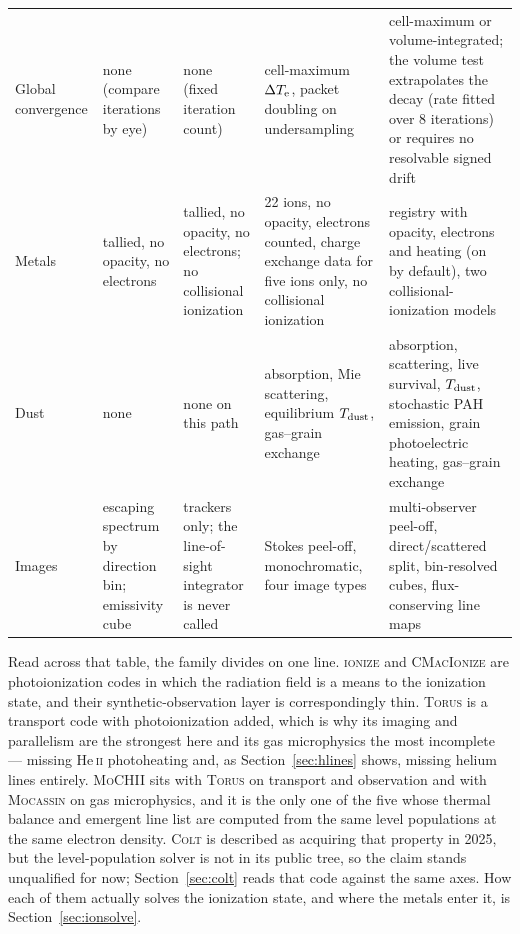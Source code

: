 \documentclass[english,a4paper]{my_memo}
\newcommand{\MoCHII}{\textsc{MoCHII}}
\newcommand{\Wood}{\textsc{ionize}}
\newcommand{\CMI}{\textsc{CMacIonize}}
\newcommand{\Torus}{\textsc{Torus}}
\newcommand{\Mocassin}{\textsc{Mocassin}}
\newcommand{\Colt}{\textsc{Colt}}
\newcommand{\HeII}{He\,\textsc{ii}}
\newcommand{\Te}{T_{\rm e}}
\begin{document}
\begin{longtable}{P{0.135\textwidth}P{0.185\textwidth}P{0.185\textwidth}P{0.185\textwidth}P{0.185\textwidth}}
Global convergence & none (compare iterations by eye) & none (fixed
iteration count) & cell-maximum $\Delta\Te$, packet doubling on undersampling
& cell-maximum or volume-integrated; the volume test extrapolates the decay
(rate fitted over 8 iterations) or requires no resolvable signed drift \\

Metals & tallied, no opacity, no electrons & tallied, no opacity, no
electrons; no collisional ionization & 22 ions, no opacity, electrons
counted, charge exchange data for five ions only, no collisional ionization &
registry with opacity, electrons and heating (on by default), two
collisional-ionization models \\

Dust & none & none on this path & absorption, Mie scattering, equilibrium
$T_{\rm dust}$, gas--grain exchange & absorption, scattering, live survival,
$T_{\rm dust}$, stochastic PAH emission, grain photoelectric heating,
gas--grain exchange \\

Images & escaping spectrum by direction bin; emissivity cube & trackers only;
the line-of-sight integrator is never called & Stokes peel-off,
monochromatic, four image types & multi-observer peel-off, direct/scattered
split, bin-resolved cubes, flux-conserving line maps \\
\end{longtable}
\endgroup

Read across that table, the family divides on one line.  \Wood{} and \CMI{}
are photoionization codes in which the radiation field is a means to the
ionization state, and their synthetic-observation layer is correspondingly
thin.  \Torus{} is a transport code with photoionization added, which is why
its imaging and parallelism are the strongest here and its gas microphysics
the most incomplete --- missing \HeII{} photoheating and, as
Section~\ref{sec:hlines} shows, missing helium lines entirely.  \MoCHII{}
sits with \Torus{} on transport and observation and with \Mocassin{} on gas
microphysics, and it is the only one of the five whose thermal balance and
emergent line list are computed from the same level populations at the same
electron density.  \Colt{} is described as acquiring that property in 2025,
but the level-population solver is not in its public tree, so the claim
stands unqualified for now; Section~\ref{sec:colt} reads that code against
the same axes.  How each of them actually solves the ionization
state, and where the metals enter it, is Section~\ref{sec:ionsolve}.
\end{document}
